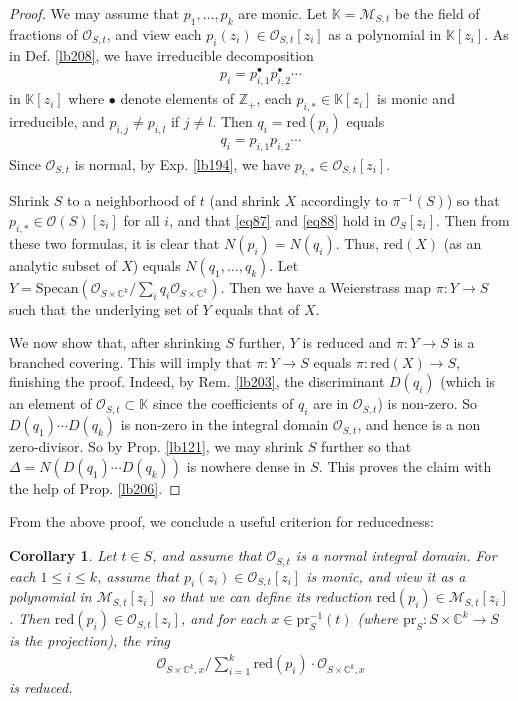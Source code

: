 \documentclass[12pt,b5paper,notitlepage]{report}
\theoremstyle{definition}
\theoremstyle{plain}
\newtheorem{co}[df]{Corollary}
\newcommand{\scr}{\mathscr}
\newcommand{\blt}{\bullet}
\newcommand{\Kbb}{\mathbb K}
\newcommand{\Cbb}{\mathbb C}
\newcommand{\Zbb}{\mathbb Z}
\newcommand{\pr}{\mathrm {pr}}
\newcommand{\Specan}{\mathrm{Specan}}
\newcommand{\red}{\mathrm{red}}
\numberwithin{equation}{section}
\begin{document}
\begin{proof}
We may assume that $p_1,\dots,p_k$ are monic. Let $\Kbb=\scr M_{S,t}$ be the field of fractions of $\scr O_{S,t}$, and view each $p_i(z_i)\in\scr O_{S,t}[z_i]$ as a polynomial in $\Kbb[z_i]$. As in Def. \ref{lb208}, we have irreducible decomposition
\begin{align}
p_i=p_{i,1}^\blt p_{i,2}^\blt\cdots\label{eq87}
\end{align}
in $\Kbb[z_i]$ where $\blt$ denote elements of $\Zbb_+$, each $p_{i,*}\in\Kbb[z_i]$ is monic and irreducible, and $p_{i,j}\neq p_{i,l}$ if $j\neq l$. Then $q_i=\red(p_i)$ equals
\begin{align}
q_i=p_{i,1}p_{i,2}\cdots\label{eq88}
\end{align}
Since $\scr O_{S,t}$ is normal, by Exp. \ref{lb194}, we have $p_{i,*}\in\scr O_{S,t}[z_i]$. 

Shrink $S$ to a neighborhood of $t$ (and shrink $X$ accordingly to $\pi^{-1}(S)$) so that $p_{i,*}\in\scr O(S)[z_i]$ for all $i$, and that \eqref{eq87} and \eqref{eq88} hold in $\scr O_S[z_i]$. Then from these two formulas, it is clear that $N(p_i)=N(q_i)$. Thus, $\red(X)$ (as an analytic subset of $X$) equals $N(q_1,\dots,q_k)$. Let $Y=\Specan(\scr O_{S\times\Cbb^k}/\sum_i q_i\scr O_{S\times\Cbb^k})$. Then we have a Weierstrass map $\pi:Y\rightarrow S$ such that the underlying set of $Y$ equals that of $X$.

We now show that, after shrinking $S$ further, $Y$ is reduced and $\pi:Y\rightarrow S$ is a branched covering. This will imply that $\pi:Y\rightarrow S$ equals $\pi:\red(X)\rightarrow S$, finishing the proof. Indeed, by Rem. \ref{lb203}, the discriminant $D(q_i)$ (which is an element of $\scr O_{S,t}\subset\Kbb$ since the coefficients of $q_i$ are in $\scr O_{S,t}$) is non-zero. So $D(q_1)\cdots D(q_k)$ is non-zero in the integral domain $\scr O_{S,t}$, and hence is a non zero-divisor. So by Prop. \ref{lb121}, we may shrink $S$ further so that $\Delta=N(D(q_1)\cdots D(q_k))$ is nowhere dense in $S$. This proves the claim with the help of Prop. \ref{lb206}.
\end{proof}

From the above proof, we conclude a useful criterion for reducedness:

\begin{co}\label{lb379}
Let $t\in S$, and assume that $\scr O_{S,t}$ is a normal integral domain. For each $1\leq i\leq k$, assume that $p_i(z_i)\in\scr O_{S,t}[z_i]$ is monic, and view it as a polynomial in $\scr M_{S,t}[z_i]$ so that we can define its reduction $\red(p_i)\in\scr M_{S,t}[z_i]$. Then $\red(p_i)\in\scr O_{S,t}[z_i]$, and for each $x\in\pr_S^{-1}(t)$ (where $\pr_S:S\times\Cbb^k\rightarrow S$ is the projection), the ring
\begin{align*}
\scr O_{S\times\Cbb^k,x}\Big/ \sum_{i=1}^k\red(p_i)\cdot\scr O_{S\times\Cbb^k,x}
\end{align*}
is reduced.
\end{co}
\end{document}

